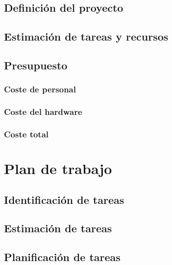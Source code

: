 \documentclass[12pt,a4paper,onecolumn,oneside]{report}
\begin{document}
\subsection{Definición del proyecto}



\subsection{Estimación de tareas y recursos}



\subsection{Presupuesto}


\subsubsection{Coste de personal}


\subsubsection{Coste del hardware}



\subsubsection{Coste total}

\section{Plan de trabajo}
\label{Plan de trabajo}


\subsection{Identificación de tareas}
\label{Identificación de tareas}



\subsection{Estimación de tareas}
\label{Estimación de tareas}

\subsection{Planificación de tareas}
\label{Planificación de tareas}
\end{document}
